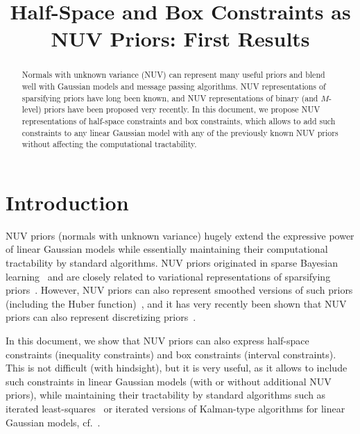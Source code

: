 \documentclass[conference]{IEEEtran}
\begin{document}
{}
\title{Half-Space and Box Constraints as NUV Priors: First Results}
\author{
}

\maketitle

\begin{abstract}
Normals with unknown variance (NUV) can represent many useful priors
and blend well with Gaussian models and message passing algorithms.
NUV representations of sparsifying priors have long been known,
and NUV representations of binary (and $M$-level) priors
have been proposed very recently. In this document,
we propose NUV representations of half-space constraints and
box constraints,
which allows to add such constraints to any linear Gaussian model
with any of the previously known NUV priors without affecting
the computational tractability.
\end{abstract}

\section{Introduction}
NUV priors (normals with unknown variance)
hugely extend the expressive power of linear Gaussian models
while essentially maintaining their computational tractability by standard algorithms. 
NUV priors originated in sparse Bayesian 
learning~\cite{mackay1992bayesian,tipping_sparse_2001,
tipping_fast_2003,wipf_sparse_2004,wipf_new_2008,loeliger_sparsity_2016} 
and are closely related to variational representations of sparsifying 
priors~\cite{bach_optimization_2012,loeliger_factor_2018}.
However, NUV priors can also represent smoothed versions of 
such priors (including the Huber function)~\cite{loeliger_factor_2018}, 
and it has very recently been shown that 
NUV priors can also represent discretizing 
priors~\cite{keusch2021binaryNUV,keusch2021binaryNUVext}.

In this document, we show that NUV priors can also express half-space 
constraints (inequality constraints) and
box constraints (interval constraints). 
This is not difficult (with hindsight), but it is very useful,
as it allows to include such constraints in linear Gaussian 
models (with or without additional NUV priors),
while maintaining their tractability by standard algorithms such as
iterated least-squares~\cite{byrd1979convergence,schroeder1991lp} or iterated versions of Kalman-type algorithms for linear Gaussian models, 
cf.\ \cite{loeliger_sparsity_2016,loeliger_factor_2018}.
\end{document}
